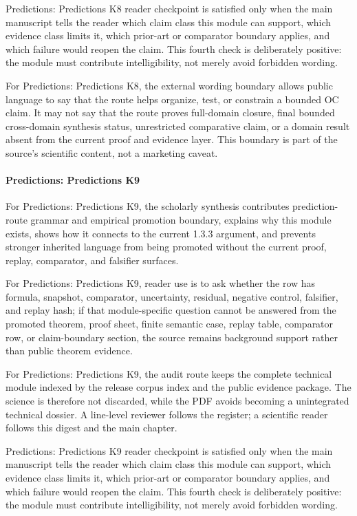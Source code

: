 Predictions: Predictions K8 reader checkpoint is satisfied only when the main manuscript tells the reader which claim class this module can support, which evidence class limits it, which prior-art or comparator boundary applies, and which failure would reopen the claim. This fourth check is deliberately positive: the module must contribute intelligibility, not merely avoid forbidden wording.


For Predictions: Predictions K8, the external wording boundary allows public language to say that the route helps organize, test, or constrain a bounded OC claim. It may not say that the route proves full-domain closure, final bounded cross-domain synthesis status, unrestricted comparative claim, or a domain result absent from the current proof and evidence layer. This boundary is part of the source's scientific content, not a marketing caveat.


\paragraph{Predictions: Predictions K9}

For Predictions: Predictions K9, the scholarly synthesis contributes prediction-route grammar and empirical promotion boundary, explains why this module exists, shows how it connects to the current 1.3.3 argument, and prevents stronger inherited language from being promoted without the current proof, replay, comparator, and falsifier surfaces.


For Predictions: Predictions K9, reader use is to ask whether the row has formula, snapshot, comparator, uncertainty, residual, negative control, falsifier, and replay hash; if that module-specific question cannot be answered from the promoted theorem, proof sheet, finite semantic case, replay table, comparator row, or claim-boundary section, the source remains background support rather than public theorem evidence.


For Predictions: Predictions K9, the audit route keeps the complete technical module indexed by the release corpus index and the public evidence package. The science is therefore not discarded, while the PDF avoids becoming a unintegrated technical dossier. A line-level reviewer follows the register; a scientific reader follows this digest and the main chapter.


Predictions: Predictions K9 reader checkpoint is satisfied only when the main manuscript tells the reader which claim class this module can support, which evidence class limits it, which prior-art or comparator boundary applies, and which failure would reopen the claim. This fourth check is deliberately positive: the module must contribute intelligibility, not merely avoid forbidden wording.


